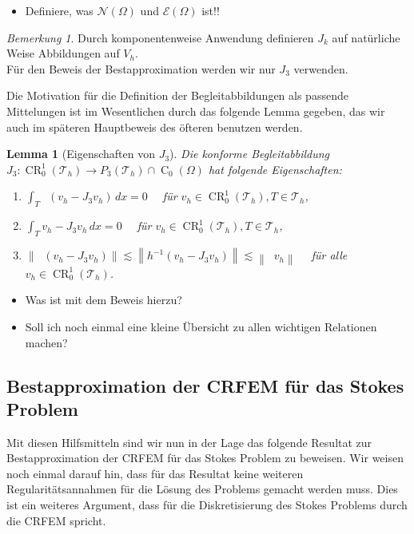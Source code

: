 \message{ !name(script.tex)}\documentclass[a4paper]{scrartcl}
\newcommand{\crfem}{\operatorname{CR}_0^1}
\newcommand{\czero}{\operatorname{C}_0}
\newcommand{\J}[1]{J_{#1}}
\newcommand{\mesh}{\mathcal{T}_h}
\newcommand{\edges}{\mathcal{E}}
\newcommand{\dx}{\,dx}
\newcommand{\norm}[1]{\left\lVert#1\right\rVert}
\DeclareMathOperator{\nablah}{\nabla_{\textit{h}}}
\theoremstyle{plain}
\newtheorem{lemma}{Lemma}
\theoremstyle{definition}
\theoremstyle{remark}
\newtheorem*{remark*}{Bemerkung}
\begin{document}
{\color{red}
  \begin{itemize}
  \item Definiere, was \(\mathcal{N}(\Omega)\) und \(\edges(\Omega)\) ist!!
  \end{itemize}
}

\begin{remark*}
  Durch komponentenweise Anwendung definieren \(J_k\) auf natürliche
  Weise Abbildungen auf \(V_h\). \\
  Für den Beweis der Bestapproximation werden wir nur \(J_3\)
  verwenden. 
\end{remark*}

\noindent Die Motivation für die Definition der Begleitabbildungen als passende
Mittelungen ist im Wesentlichen durch das folgende Lemma gegeben, das
wir auch im späteren Hauptbeweis des öfteren benutzen werden. 

\begin{lemma}[Eigenschaften von \(J_3\)]\label{lem:2}
  Die konforme Begleitabbildung \(\J3\colon \crfem(\mesh) \rightarrow
  P_3(\mesh)\cap\czero(\Omega)\) hat folgende Eigenschaften: 
  \begin{enumerate}[label=(\roman*)]
  \item \(\int_T \nablah(v_h - \J3 v_h)\dx = 0 \quad\) für \(v_h \in
    \crfem(\mesh), T\in \mesh\),
  \item \(\int_T v_h - \J3 v_h \dx = 0 \quad\) für \(v_h \in
    \crfem(\mesh), T\in \mesh\),
  \item \(\norm{\nablah (v_h - \J3 v_h)} \lesssim \norm{h^{-1}(v_h -
      \J3 v_h)} \lesssim \norm{\nablah v_h} \quad\) für alle \(v_h \in
    \crfem(\mesh)\).
  \end{enumerate}
\end{lemma}

{\color{red}
  \begin{itemize}
  \item Was ist mit dem Beweis hierzu?
  \item Soll ich noch einmal eine kleine Übersicht zu allen wichtigen
    Relationen machen? 
  \end{itemize}
}


\subsection{Bestapproximation der CRFEM für das Stokes Problem}
\label{sec:best-der-crfem}

Mit diesen Hilfsmitteln sind wir nun in der Lage das folgende Resultat
zur Bestapproximation der CRFEM für das Stokes Problem zu beweisen. 
Wir weisen noch einmal darauf hin, dass für das Resultat keine
weiteren Regularitätsannahmen für die Lösung des Problems gemacht
werden muss. Dies ist ein weiteres Argument, dass für die
Diskretisierung des Stokes Problems durch die CRFEM spricht. 
\end{document}
